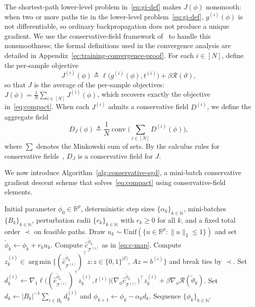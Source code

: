 \documentclass[11pt, letterpaper, oneside, reqno]{amsart}
\DeclareMathOperator*{\argmin}{arg\,min}
\newcommand{\R}{\mathbb{R}}
\newcommand{\Let}{\triangleq}
\begin{document}
The shortest-path lower-level problem in~\eqref{eq:gi-def} makes $J(\phi)$ nonsmooth: when two or more paths tie in the lower-level problem~\eqref{eq:gi-def}, $g^{(i)}(\phi)$ is not differentiable, so ordinary backpropagation does not produce a unique gradient. 
We use the conservative-field framework of~\cite{ref:bolte2021conservative} to handle this nonsmoothness; the formal definitions used in the convergence analysis are detailed in Appendix~\ref{ec:training-convergence-proof}. For each $i \in [N]$, define the per-sample objective
\begin{equation}
J^{(i)}(\phi)
\Let
\ell\bigl(g^{(i)}(\phi), t^{(i)}\bigr) + \beta \mathcal R(\vartheta),
\label{eq:Ji-def}
\end{equation}
so that $J$ is the average of the per-sample objectives: $J(\phi) = \frac{1}{N} \sum_{i \in [N]} J^{(i)}(\phi)$, which recovers exactly the objective in~\eqref{eq:compact}.
When each $J^{(i)}$ admits a conservative field $D^{(i)}$, we define the aggregate field
\[
D_J(\phi) \Let \frac{1}{N}\operatorname{conv}\bigl(\sum_{i\in[N]} D^{(i)}(\phi)\bigr),
\]
where $\sum$ denotes the Minkowski sum of sets. By the calculus rules for conservative fields~\cite[Section~6.1]{ref:bolte2021conservative}, $D_J$ is a conservative field for $J$.

We now introduce Algorithm~\ref{alg:conservative-sgd}, a mini-batch conservative gradient descent scheme that solves~\eqref{eq:compact} using conservative-field elements.

\begin{algorithm}
\caption{Mini-batch conservative gradient descent for \eqref{eq:compact}}
\begin{algorithmic}[1]
\Require Initial parameter $\phi_0\in\R^p$, deterministic step sizes $\{\alpha_k\}_{k\in\mathbb N}$, mini-batches $\{B_k\}_{k\in\mathbb N}$, perturbation radii $\{r_k\}_{k\in\mathbb N}$ with $r_k\ge 0$ for all $k$, and a fixed total order $\prec$ on feasible paths.
    \State Draw $u_k\sim \mathrm{Unif}(\{u\in\R^p:\|u\|_2\le 1\})$ and set $\tilde\phi_k \leftarrow \phi_k + r_k u_k$.
        \State Compute $\hat c_{\mathcal T^{(i)}}^{\tilde\phi_k}$ as in \eqref{eq:c-map}.
        \State Compute
        $z_k^{(i)} \in \argmin\{ (\hat c_{\mathcal T^{(i)}}^{\tilde\phi_k})^\top z : z\in\{0,1\}^{|\mathcal E|},\, A z=b^{(i)}\}$ and break ties by $\prec$.
        \State Set $d_k^{(i)} \leftarrow \nabla_1 \ell\bigl((\hat c_{\mathcal T^{(i)}}^{\tilde\phi_k})^\top z_k^{(i)}, t^{(i)}\bigr) \bigl(\nabla_\phi \hat c_{\mathcal T^{(i)}}^{\tilde\phi_k}\bigr)^\top z_k^{(i)}
        + \beta \nabla_\phi \mathcal R(\tilde\vartheta_k)$.
    \EndFor
    \State Set $d_k \leftarrow |B_k|^{-1} \sum_{i \in B_k} d_k^{(i)}$ and $\phi_{k+1} \leftarrow \phi_k - \alpha_k d_k$.
\EndFor
\Ensure Sequence $\{\phi_k\}_{k\in\mathbb N}$.
\end{algorithmic}
\label{alg:conservative-sgd}
\end{algorithm}
\end{document}
